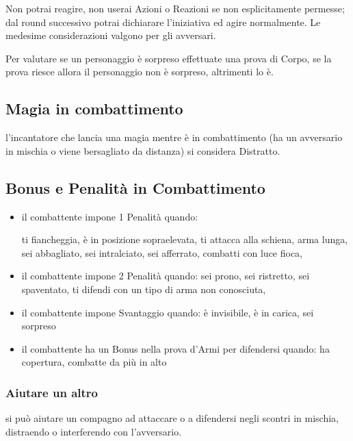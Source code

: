 \documentclass[12pt,a4paper,twoside,openany]{book}
\begin{document}
\begin{multicols}{2}
Non potrai reagire, non userai Azioni o Reazioni se non esplicitamente permesse; dal round successivo potrai dichiarare l'iniziativa ed agire normalmente. Le medesime considerazioni valgono per gli avversari.

Per valutare se un personaggio è sorpreso effettuate una prova di Corpo, se la prova riesce allora il personaggio non è sorpreso, altrimenti lo è.

\subsection{Magia in combattimento}\label{magiaincombattimento}

l'incantatore che lancia una magia mentre è in combattimento (ha un avversario in mischia o viene bersagliato da distanza) si considera Distratto.

\subsection{Bonus e Penalità in Combattimento}

\begin{itemize}

\item 
il combattente impone 1 Penalità quando:

\subitem ti fiancheggia, è in posizione sopraelevata, ti attacca alla schiena, arma lunga, sei abbagliato, sei intralciato, sei afferrato, combatti con luce fioca, 

\item 
il combattente impone 2 Penalità quando:
\subitem sei prono, sei ristretto, sei spaventato, ti difendi con un tipo di arma non conosciuta, 

\item 
il combattente impone Svantaggio quando:
\subitem è invisibile, è in carica, sei sorpreso

\item 
il combattente ha un Bonus nella prova d'Armi per difendersi quando:
\subitem ha copertura, combatte da più in alto

\end{itemize}

\subsubsection{Aiutare un altro}\label{aiutare}

si può aiutare un compagno ad attaccare o a difendersi negli scontri in mischia, distraendo o interferendo con l'avversario. 


\end{multicols}
\end{document}
